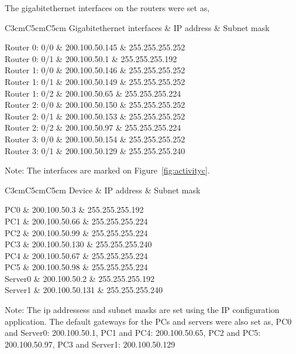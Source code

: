 \documentclass{lab_sheet}
\newcommand{\setting}[2]{
    \begin{tabular}{C{3cm}C{5cm}C{5cm}}
        \toprule
          #1 & IP address & Subnet mask\\
          \midrule
          #2
          \bottomrule
       \end{tabular}
}
\begin{document}
The gigabitethernet interfaces on the routers were set as,
\begin{table}[H]
	\centering
	\begin{threeparttable}
		\setting{Gigabitethernet interfaces}{
			Router 0: 0/0 & 200.100.50.145  & 255.255.255.252 \\
			Router 0: 0/1 & 200.100.50.1  & 255.255.255.192 \\
			Router 1: 0/0 & 200.100.50.146 & 255.255.255.252 \\
			Router 1: 0/1 & 200.100.50.149  & 255.255.255.252 \\
			Router 1: 0/2 & 200.100.50.65  & 255.255.255.224 \\
			Router 2: 0/0 & 200.100.50.150  & 255.255.255.252 \\
			Router 2: 0/1 & 200.100.50.153  & 255.255.255.252 \\
			Router 2: 0/2 & 200.100.50.97  & 255.255.255.224 \\
			Router 3: 0/0 & 200.100.50.154 & 255.255.255.252 \\
			Router 3: 0/1 & 200.100.50.129  & 255.255.255.240 \\
		}
		\begin{tablenotes}
			\small
			\item Note: The interfaces are marked on Figure~\ref{fig:activityc}.
		\end{tablenotes}
		\caption{IP address and subnet masks for the gigabitethernet interfaces on the routers}
		\label{tbl:gigasettingc}
	\end{threeparttable}
\end{table}

\begin{table}[H]
	\centering
	\begin{threeparttable}
		\setting{Device}{
			PC0 & 200.100.50.3  & 255.255.255.192 \\
			PC1 & 200.100.50.66 & 255.255.255.224 \\
			PC2 & 200.100.50.99  & 255.255.255.224 \\
			PC3 & 200.100.50.130 & 255.255.255.240 \\
			PC4 & 200.100.50.67  & 255.255.255.224 \\
			PC5 & 200.100.50.98  & 255.255.255.224 \\
			Server0 & 200.100.50.2  & 255.255.255.192 \\
			Server1 & 200.100.50.131  & 255.255.255.240 \\
		}
		\begin{tablenotes}
			\small
			\item Note: The ip addressess and subnet masks are set using the IP configuration application. The default gateways for the PCs and servers were also set as, PC0 and Server0: 200.100.50.1, PC1 and PC4: 200.100.50.65, PC2 and PC5: 200.100.50.97, PC3 and Server1: 200.100.50.129
		\end{tablenotes}
		\caption{IP address and subnet masks for the PCs and servers in the network}
		\label{tbl:pcsettingc}
	\end{threeparttable}
\end{table}
\end{document}

